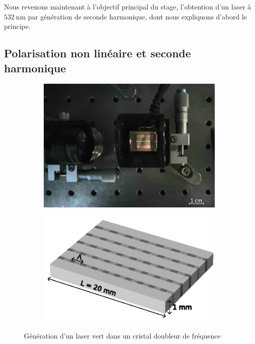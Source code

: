 \documentclass[11pt,a4paper] { article}
\newcommand{\lmbd}[1]{$\SI{#1}{\nano\metre}$}
\begin{document}
Nous revenons maintenant à l'objectif principal du stage, l'obtention d'un laser à \lmbd{532} par génération de seconde harmonique, dont nous expliquons d'abord le principe.

\subsection{Polarisation non linéaire et seconde harmonique}

\begin{figure}[h]
\centering
\begin{subfigure}{0.45\textwidth}
	\includegraphics[width=\textwidth]{./img/cristal clair.jpg}
\end{subfigure}
\begin{subfigure}{0.5\textwidth}
	\includegraphics[width=\textwidth]{./img/cristal.pdf}
\end{subfigure}
\caption{Génération d'un laser vert dans un cristal doubleur de fréquence}
\label{fig:cristal}
\end{figure}
\end{document}
